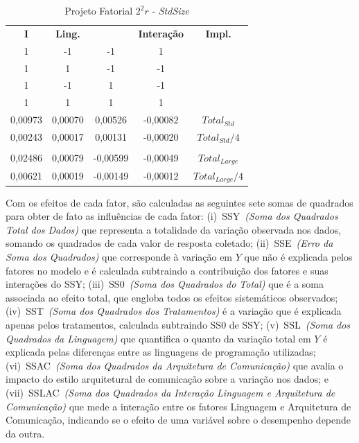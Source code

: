 \begin{table}[!ht]
    \small
    \centering
    \caption{Projeto Fatorial \(2^{2}r\) - \textit{StdSize}}
    \vspace{-5pt}
    \begin{tabular}{ccccc}
        \textbf{I} & \textbf{\small Ling.} & \textbf{\parbox{1.4cm}{\centering \small Arq. com.}} & \textbf{\small Interação} & {\small \textbf{Impl.}} \\
        1 & -1 & -1 & 1 & \gogrpc{} \\
        1 & 1 & -1 & -1 & \javagrpc{} \\
        1 & -1 & 1 & -1 & \gorest{} \\
        1 & 1 & 1 & 1 & \javarest{} \\
        0,00973 & 0,00070 & 0,00526 & -0,00082 & $Total_{Std}$\\
        0,00243 & 0,00017 & 0,00131 & -0,00020 & $Total_{Std}/4$ \\
        &\\[-0.3cm]
        0,02486 & 0,00079 & -0,00599 & -0,00049 & $Total_{Large}$\\
        0,00621 & 0,00019 & -0,00149 & -0,00012 & $Total_{Large}/4$ \\
    \end{tabular}
    \label{tab:sinais}
\end{table}

Com os efeitos de cada fator, são calculadas as seguintes sete somas de quadrados para obter de fato as influências de cada fator:
(i)~SSY~\textit{(Soma dos Quadrados Total dos Dados)} que representa a totalidade da variação observada nos dados, somando os quadrados de cada valor de resposta coletado; 
(ii)~SSE~\textit{(Erro da Soma dos Quadrados)} que corresponde à variação em \(Y\) que não é explicada pelos fatores no modelo e é calculada subtraindo a contribuição dos fatores e suas interações do SSY;
(iii)~SS0~\textit{(Soma dos Quadrados do Total)} que é a soma associada ao efeito total, que engloba todos os efeitos sistemáticos observados;
(iv)~SST~\textit{(Soma dos Quadrados dos Tratamentos)} é a variação que é explicada apenas pelos tratamentos, calculada subtraindo SS0 de SSY; 
(v)~SSL~\textit{(Soma dos Quadrados da Linguagem)} que quantifica o quanto da variação total em \(Y\) é explicada pelas diferenças entre as linguagens de programação utilizadas;
(vi)~SSAC~\textit{(Soma dos Quadrados da Arquitetura de Comunicação)} que avalia o impacto do estilo arquitetural de comunicação sobre a variação nos dados; e
(vii)~SSLAC~\textit{(Soma dos Quadrados da Interação Linguagem e Arquitetura de Comunicação)} que mede a interação entre os fatores Linguagem e Arquitetura de Comunicação, indicando se o efeito de uma variável sobre o desempenho depende da outra.


